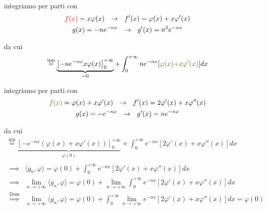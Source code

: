 \begin{enumerate}
integriamo per parti con
\begin{gather*}
\textcolor[rgb]{0.82, 0.01, 0.11}{f}\textcolor[rgb]{0.82, 0.01, 0.11}{(}\textcolor[rgb]{0.82, 0.01, 0.11}{x}\textcolor[rgb]{0.82, 0.01, 0.11}{)} = x\varphi (x) \ \ \rightarrow \ \ f'(x) = \varphi (x) + x\varphi '(x)\\
g(x) = - ne^{- nx} \ \ \rightarrow \ \ g'(x) = n^{2} e^{- nx}
\end{gather*}

da cui
\begin{equation*}
\overset{\text{ipp}}{=}\underbrace{\left[ - ne^{- nx} x\varphi (x)\right]^{+ \infty}_{0}}_{= 0} + \int^{+ \infty}_{0} ne^{- nx}[\textcolor[rgb]{0.25, 0.46, 0.02}{\varphi}\textcolor[rgb]{0.25, 0.46, 0.02}{(}\textcolor[rgb]{0.25, 0.46, 0.02}{x}\textcolor[rgb]{0.25, 0.46, 0.02}{)}\textcolor[rgb]{0.25, 0.46, 0.02}{+ x\varphi '}\textcolor[rgb]{0.25, 0.46, 0.02}{(}\textcolor[rgb]{0.25, 0.46, 0.02}{x}\textcolor[rgb]{0.25, 0.46, 0.02}{)}] dx
\end{equation*}

integriamo per parti con
\begin{gather*}
\textcolor[rgb]{0.25, 0.46, 0.02}{f}\textcolor[rgb]{0.25, 0.46, 0.02}{(}\textcolor[rgb]{0.25, 0.46, 0.02}{x}\textcolor[rgb]{0.25, 0.46, 0.02}{)} = \varphi (x) + x\varphi '(x) \ \ \rightarrow \ \ f'(x) = 2\varphi '(x) + x\varphi ''(x)\\
g(x) = - e^{- nx} \ \ \rightarrow \ \ g'(x) = ne^{- nx}
\end{gather*}

da cui
\begin{gather*}
\overset{\text{ipp}}{=}\underbrace{\left[ - e^{- nx}(\varphi (x) + x\varphi '(x))\right]^{+ \infty}_{0}}_{\varphi (0)} + \int^{+ \infty}_{0} e^{- nx}[ 2\varphi '(x) + x\varphi ''(x)] dx\\
\begin{aligned}
\implies  & \langle g_{n}, \varphi \rangle = \varphi (0) + \int^{+ \infty}_{0} e^{- nx}[ 2\varphi '(x) + x\varphi ''(x)] dx\\
\implies  & \lim\limits_{n\rightarrow + \infty} \langle g_{n}, \varphi \rangle = \varphi (0) + \lim\limits_{n\rightarrow + \infty}\int^{+ \infty}_{0} e^{- nx}[ 2\varphi '(x) + x\varphi ''(x)] dx\\
\overset{\text{Dom}}{\implies} & \lim\limits_{n\rightarrow + \infty} \langle g_{n}, \varphi \rangle = \varphi (0) + \int^{+ \infty}_{0}\lim\limits_{n\rightarrow + \infty} e^{- nx}[ 2\varphi '(x) + x\varphi ''(x)] dx = \varphi (0)
\end{aligned}
\end{gather*}


\end{enumerate}
